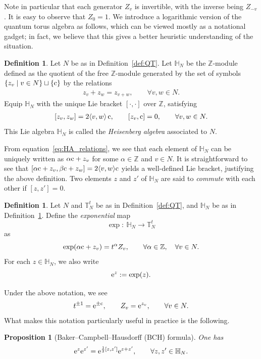 \documentclass[10pt,a4paper]{amsart}
\numberwithin{equation}{section}
\newtheorem{Proposition}[Theorem]{Proposition}
\theoremstyle{definition}
\newtheorem{Definition}[Theorem]{Definition}
\begin{document}
Note in particular that each generator $Z_v$ is invertible, with the inverse being $Z_{-v}$. It is easy to observe that $Z_0 = 1$.
We introduce a logarithmic version of the quantum torus algebra as follows, which can be viewed mostly as a notational gadget; in fact, we believe that this gives a better heuristic understanding of the situation.
\begin{Definition}
\label{def:HA}
Let $N$ be as in Definition~\ref{def:QT}. Let $\mathbb{H}_N$ be the $\mathbb{Z}$-module defined as the quotient of the free $\mathbb{Z}$-module generated by the set of symbols $\{ z_v \mid v\in N\} \sqcup \{{\rm c}\}$ by the relations
\begin{align}
\label{eq:HA_relations}
z_v + z_w = z_{v+w}, \qquad \forall v,w\in N.
\end{align}
Equip $\mathbb{H}_N$ with the unique Lie bracket $[\cdot,\cdot]$ over $\mathbb{Z}$, satisfying
\begin{align}
\label{eq:HA_commutation}
[z_v, z_w] = 2 \langle v,w\rangle \, {\rm c}, \qquad [z_v,{\rm c}]=0, \qquad \forall v,w\in N.
\end{align}
This Lie algebra $\mathbb{H}_N$ is called the {\em Heisenberg algebra} associated to $N$.
\end{Definition}
From equation~\eqref{eq:HA_relations}, we see that each element of $\mathbb{H}_N$ can be uniquely written as $\alpha {\rm c} + z_v$ for some $\alpha \in \mathbb{Z}$ and $v\in N$. It is straightforward to see that $[\alpha {\rm c} + z_v, \beta {\rm c} + z_w ] = 2 \langle v,w\rangle {\rm c}$ yields a well-defined Lie bracket, justifying the above definition. Two elements $z$ and $z'$ of $\mathbb{H}_N$ are said to {\em commute} with each other if $[z,z']=0$.
\begin{Definition}
\label{def:HA_exp}
Let $N$ and $\mathbb{T}^t_N$ be as in Definition~\ref{def:QT}, and $\mathbb{H}_N$ be as in Definition~\ref{def:HA}. Define the {\em exponential} map
\[
\exp \colon \ \mathbb{H}_N \to \mathbb{T}^t_N
\]
as
\[
\exp( \alpha {\rm c} + z_v ) = t^\alpha Z_v, \qquad \forall \alpha \in \mathbb{Z}, \quad \forall v\in N.
\]
For each $z\in \mathbb{H}_N$, we also write
\[
{\rm e}^z := \exp(z).
\]
\end{Definition}
Under the above notation, we see
\[
t^{\pm 1} = {\rm e}^{\pm {\rm c}}, \qquad Z_v = {\rm e}^{z_v}, \qquad \forall v\in N.
\]
What makes this notation particularly useful in practice is the following.
\begin{Proposition}[Baker--Campbell--Hausdorff (BCH) formula]
\label{prop:BCH}
One has
\[
{\rm e}^z {\rm e}^{z'} = {\rm e}^{\frac{1}{2} [z,z']} {\rm e}^{z+z'}, \qquad \forall z,z' \in \mathbb{H}_N.
\]
\end{Proposition}
\end{document}
